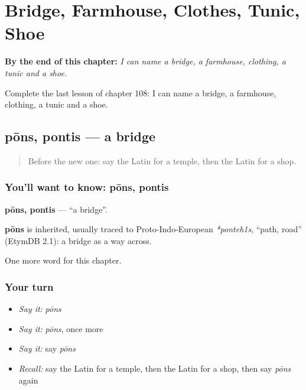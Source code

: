 
\chapter{Bridge, Farmhouse, Clothes, Tunic, Shoe}
\label{ch:la-bridge-farmhouse-clothes-tunic-shoe}

\begin{chapteropening}
\textbf{By the end of this chapter:} \emph{I can name a bridge, a farmhouse, clothing, a tunic and a shoe.}

Complete the last lesson of chapter 108: I can name a bridge, a farmhouse, clothing, a tunic and a shoe.
\end{chapteropening}

\section[pōns, pontis]{pōns, pontis — a bridge}

\label{lesson:LA-C108-pons}



\begin{quote}
Before the new one: say the Latin for a temple, then the Latin for a shop.
\end{quote}

\subsection*{You'll want to know: pōns, pontis}
\textbf{pōns, pontis} — \textquotedblleft{}a bridge\textquotedblright{}.

\begin{cousinweb}
\textbf{pōns} is inherited, usually traced to Proto-Indo-European \emph{*ponteh1s}, \textquotedblleft{}path, road\textquotedblright{} (EtymDB 2.1): a bridge as a way across.
\end{cousinweb}

\begin{grammarlens}[title={What you've built}]
One more word for this chapter.
\end{grammarlens}

\subsection*{Your turn}
\begin{itemize}
\raggedright
  \item \emph{Say it:} \emph{pōns}
  \item \emph{Say it:} \emph{pōns}, once more
  \item \emph{Say it:} say \emph{pōns}
  \item \emph{Recall:} say the Latin for a temple, then the Latin for a shop, then say \emph{pōns} again
\end{itemize}

